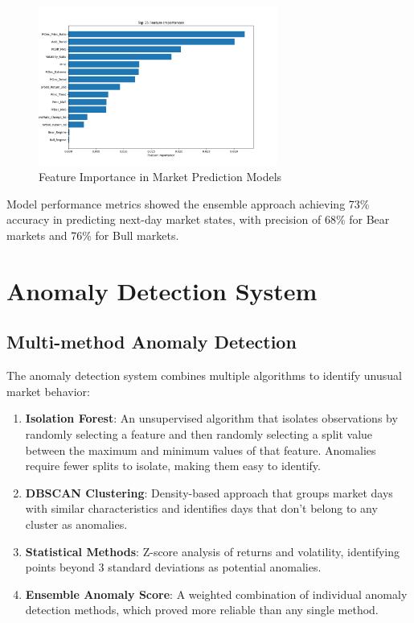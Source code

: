 \documentclass[10pt]{article}
\begin{document}
\begin{figure}[htbp]
	\centering
	\includegraphics[width=0.7\textwidth]{../results/feature_importance.png}
	\caption{Feature Importance in Market Prediction Models}
	\label{fig:feature_importance}
\end{figure}

Model performance metrics showed the ensemble approach achieving 73\% accuracy in predicting next-day market states, with precision of 68\% for Bear markets and 76\% for Bull markets.

\section{Anomaly Detection System}
\subsection{Multi-method Anomaly Detection}
The anomaly detection system combines multiple algorithms to identify unusual market behavior:

\begin{enumerate}
	\item \textbf{Isolation Forest}: An unsupervised algorithm that isolates observations by randomly selecting a feature and then randomly selecting a split value between the maximum and minimum values of that feature. Anomalies require fewer splits to isolate, making them easy to identify.

	\item \textbf{DBSCAN Clustering}: Density-based approach that groups market days with similar characteristics and identifies days that don't belong to any cluster as anomalies.

	\item \textbf{Statistical Methods}: Z-score analysis of returns and volatility, identifying points beyond 3 standard deviations as potential anomalies.

	\item \textbf{Ensemble Anomaly Score}: A weighted combination of individual anomaly detection methods, which proved more reliable than any single method.
\end{enumerate}
\end{document}
